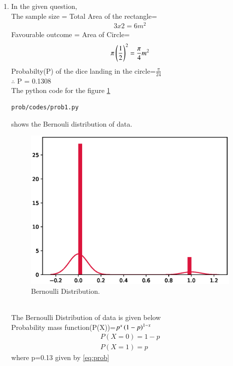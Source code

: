 \renewcommand{\theequation}{\theenumi}
\begin{enumerate}[label=\arabic*.,ref=\thesubsubsection.\theenumi]

\item In the given question,
\\
The sample size = Total Area of the rectangle=
\begin{align}
3x2=6 m^2
\end{align}
Favourable outcome = Area of Circle=
\begin{align}
\pi\left(\frac{1}{2}\right)^2=\frac{\pi}{4} m^2 
\end{align}
Probabilty(P) of the dice landing in the circle=$\frac{\pi}{24}$
\\
$\therefore$ P = 0.1308
\label{eq:prob}
\\
The python code for the figure \ref{fig:figure}
\begin{lstlisting}
prob/codes/prob1.py
\end{lstlisting}
shows the Bernouli distribution of data.
\begin{figure}[!ht]
\centering
\includegraphics[width=\columnwidth]{./prob/figs/prob(ber).eps}
\caption{Bernoulli Distribution.}
\label{fig:figure}
\end{figure}
\\
The Bernoulli Distribution of data is given below
\\
Probability mass function(P(X))=$p^x\left(1-p\right)^{1-x}$
\begin{align}
P(X=0)=1-p
\\
P(X=1)=p
\end{align}
where p=0.13 given by \ref{eq:prob}
\end{enumerate}
